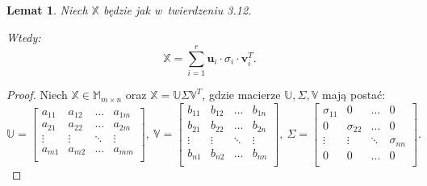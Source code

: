 \documentclass[12pt,a4paper]{report}
\newtheorem{lemat}[df]{Lemat}
\begin{document}
\begin{lemat}
Niech $\mathbb{X}$ będzie jak w~twierdzeniu 3.12.

Wtedy:
$$
\mathbb{X} = \sum_{i=1}^r \mathbf{u}_i \cdot\sigma_i \cdot \mathbf{v}_i^T.
$$
\end{lemat}
\begin{proof}
Niech $\mathbb{X} \in \mathbb{M}_{m \times n}$ oraz $\mathbb{X}=\mathbb{U} \Sigma \mathbb{V}^T$, gdzie macierze $\mathbb{U}, \Sigma, \mathbb{V}$ mają postać:
$$
\mathbb{U} = \left[
        \begin{array}{cccc}
         a_{11} & a_{12} & \ldots & a_{1m} \\
         a_{21} & a_{22} & \ldots & a_{2m} \\
         \vdots & \vdots & \ddots & \vdots \\
         a_{m1} & a_{m2} & \ldots & a_{mm} \\
         \end{array}
      \right], \: \mathbb{V} = \left[
        \begin{array}{cccc}
         b_{11} & b_{12} & \ldots & b_{1n}  \\
         b_{21} & b_{22} & \ldots & b_{2n} \\
         \vdots & \vdots & \ddots & \vdots \\
         b_{n1} & b_{n2} & \ldots & b_{nn} \\
         \end{array}
      \right], \: \Sigma = \left[
        \begin{array}{cccc}
         \sigma_{11} & 0 & \ldots & 0 \\
         0 & \sigma_{22} & \ldots & 0 \\
         \vdots & \vdots & \ddots & \sigma_{nn} \\
         0 & 0 & \ldots & 0 \\
         \end{array}
      \right].$$
      

\end{proof}
\end{document}
